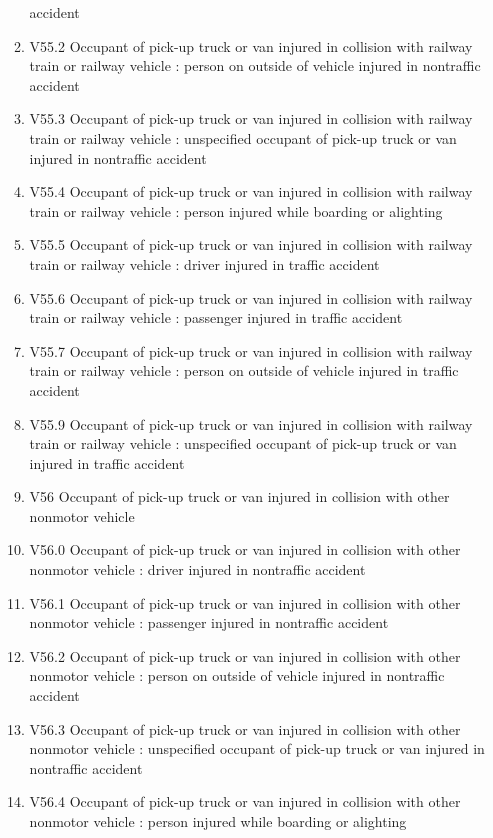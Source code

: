 \documentclass[
]{scrartcl}
\begin{document}
\begin{itemize}
\begin{enumerate}
    accident
  \item
    V55.2 Occupant of pick-up truck or van injured in collision with
    railway train or railway vehicle : person on outside of vehicle
    injured in nontraffic accident
  \item
    V55.3 Occupant of pick-up truck or van injured in collision with
    railway train or railway vehicle : unspecified occupant of pick-up
    truck or van injured in nontraffic accident
  \item
    V55.4 Occupant of pick-up truck or van injured in collision with
    railway train or railway vehicle : person injured while boarding or
    alighting
  \item
    V55.5 Occupant of pick-up truck or van injured in collision with
    railway train or railway vehicle : driver injured in traffic
    accident
  \item
    V55.6 Occupant of pick-up truck or van injured in collision with
    railway train or railway vehicle : passenger injured in traffic
    accident
  \item
    V55.7 Occupant of pick-up truck or van injured in collision with
    railway train or railway vehicle : person on outside of vehicle
    injured in traffic accident
  \item
    V55.9 Occupant of pick-up truck or van injured in collision with
    railway train or railway vehicle : unspecified occupant of pick-up
    truck or van injured in traffic accident
  \item
    V56 Occupant of pick-up truck or van injured in collision with other
    nonmotor vehicle
  \item
    V56.0 Occupant of pick-up truck or van injured in collision with
    other nonmotor vehicle : driver injured in nontraffic accident
  \item
    V56.1 Occupant of pick-up truck or van injured in collision with
    other nonmotor vehicle : passenger injured in nontraffic accident
  \item
    V56.2 Occupant of pick-up truck or van injured in collision with
    other nonmotor vehicle : person on outside of vehicle injured in
    nontraffic accident
  \item
    V56.3 Occupant of pick-up truck or van injured in collision with
    other nonmotor vehicle : unspecified occupant of pick-up truck or
    van injured in nontraffic accident
  \item
    V56.4 Occupant of pick-up truck or van injured in collision with
    other nonmotor vehicle : person injured while boarding or alighting

\end{enumerate}
\end{itemize}
\end{document}
